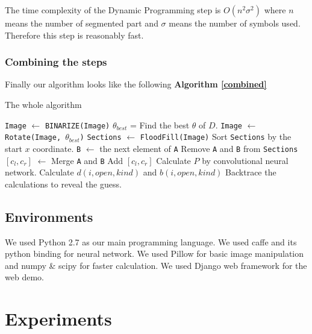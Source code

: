 \documentclass[10pt,twocolumn,letterpaper]{article}
\begin{document}
The time complexity of the Dynamic Programming step is $O(n^2 \sigma^2)$ where $n$ means the number of segmented part and
$\sigma$ means the number of symbols used. Therefore this step is reasonably fast.


\subsubsection{Combining the steps}


Finally our algorithm looks like the following \textbf{Algorithm  \ref{combined}}
\begin{algorithm}
\caption{The whole algorithm}
\label{combined}
\begin{algorithmic}[1]
\State \texttt{Image} $\gets$ \texttt{BINARIZE(Image)}
\State $\theta_{best}$ = Find the best $\theta$ of $D$.
\State \texttt{Image} $\gets$ \texttt{Rotate(Image, $\theta_{best}$)}
\State \texttt{Sections} $\gets$ \texttt{FloodFill(Image)}
\State Sort \texttt{Sections} by the start $x$ coordinate.
    \State \texttt{B} $\gets$ the next element of \texttt{A}
        \State Remove \texttt{A} and \texttt{B} from \texttt{Sections}
        \State $[c_{l}, c_{r}]$ $\gets$ Merge \texttt{A} and \texttt{B}
        \State Add $[c_{l}, c_{r}]$
    \EndIf
\EndFor
{}
    \State Calculate $P$ by convolutional neural network.
\EndFor
\State Calculate $d(i, open, kind)$ and $b(i, open, kind)$
\State Backtrace the calculations to reveal the guess.
\end{algorithmic}
\end{algorithm}


\subsection{Environments}

We used Python 2.7 as our main programming language.
We used caffe and its python binding for neural network.
We used Pillow for basic image manipulation and numpy \& scipy for faster calculation.
We used Django web framework for the web demo.

\section{Experiments}
%
%
%
%
%
\end{document}
